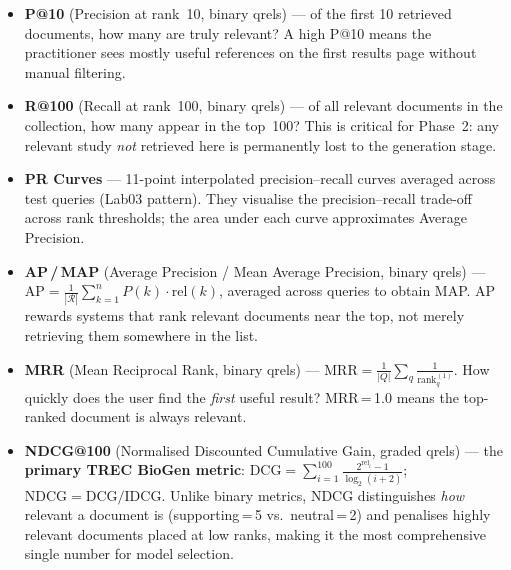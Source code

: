 \begin{itemize}
  \item \textbf{P@10} (Precision at rank~10, binary qrels) ---
        of the first 10 retrieved documents, how many are truly relevant?
        A high P@10 means the practitioner sees mostly useful references
        on the first results page without manual filtering.

  \item \textbf{R@100} (Recall at rank~100, binary qrels) ---
        of all relevant documents in the collection, how many appear in
        the top~100?  This is critical for Phase~2: any relevant study
        \emph{not} retrieved here is permanently lost to the generation
        stage.

  \item \textbf{PR Curves} --- 11-point interpolated precision--recall
        curves averaged across test queries (Lab03 pattern).  They
        visualise the precision--recall trade-off across rank thresholds;
        the area under each curve approximates Average Precision.

  \item \textbf{AP\,/\,MAP} (Average Precision / Mean Average Precision,
        binary qrels) --- $\text{AP}=\frac{1}{|\mathcal{R}|}\sum_{k=1}^{n}
        P(k)\cdot\text{rel}(k)$, averaged across queries to obtain MAP.
        AP rewards systems that rank relevant documents near the top,
        not merely retrieving them somewhere in the list.

  \item \textbf{MRR} (Mean Reciprocal Rank, binary qrels) ---
        $\text{MRR}=\frac{1}{|Q|}\sum_{q}\frac{1}{\text{rank}_q^{(1)}}$.
        How quickly does the user find the \emph{first} useful result?
        MRR\,=\,1.0 means the top-ranked document is always relevant.

  \item \textbf{NDCG@100} (Normalised Discounted Cumulative Gain, graded
        qrels) --- the \textbf{primary TREC BioGen metric}:
        $\text{DCG}=\sum_{i=1}^{100}\frac{2^{\text{rel}_i}-1}{\log_2(i+2)}$;\;
        $\text{NDCG}=\text{DCG}/\text{IDCG}$.
        Unlike binary metrics, NDCG distinguishes \emph{how} relevant a
        document is (supporting\,=\,5 vs.\ neutral\,=\,2) and penalises
        highly relevant documents placed at low ranks, making it the most
        comprehensive single number for model selection.
\end{itemize}

